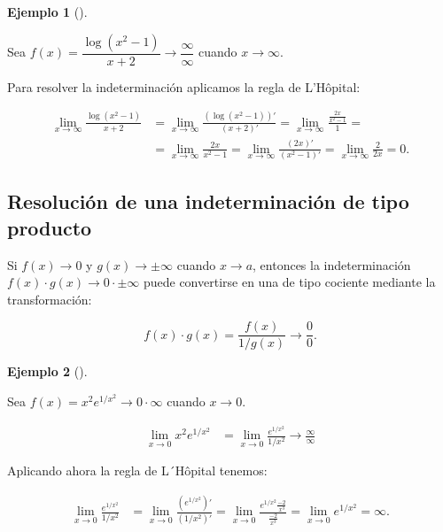 \documentclass[
  a4paper,
]{scrreport}
\theoremstyle{definition}
\newtheorem{example}{Ejemplo}[chapter]
\theoremstyle{plain}
\theoremstyle{definition}
\theoremstyle{definition}
\theoremstyle{plain}
\theoremstyle{plain}
\theoremstyle{remark}
\begin{document}
\begin{example}[]\protect\hypertarget{exm-regla-lhopital}{}\label{exm-regla-lhopital}

Sea \(f(x)=\dfrac{\log(x^2-1)}{x+2}\to \dfrac{\infty}{\infty}\) cuando
\(x\to \infty\).

Para resolver la indeterminación aplicamos la regla de L'Hôpital:

\begin{align*}
\lim_{x\to \infty}\frac{\log(x^2-1)}{x+2} &= \lim_{x\to
\infty}\frac{\left(\log(x^2-1)\right)'}{\left(x+2\right)'}= \lim_{x\to \infty}\frac{\frac{2x}{x^2-1}}{1}=\\
&=\lim_{x\to \infty}\frac{2x}{x^2-1}= \lim_{x\to \infty}\frac{\left(2x\right)'}{\left(x^2-1\right)'}=
\lim_{x\to \infty}\frac{2}{2x}=0.
\end{align*}

\end{example}

\subsection{Resolución de una indeterminación de tipo
producto}\label{resoluciuxf3n-de-una-indeterminaciuxf3n-de-tipo-producto}

Si \(f(x)\to 0\) y \(g(x)\to \pm\infty\) cuando \(x\to a\), entonces la
indeterminación \(f(x)\cdot g(x)\to 0\cdot \pm\infty\) puede convertirse
en una de tipo cociente mediante la transformación:

\[f(x)\cdot g(x) = \frac{f(x)}{1/g(x)}\to \frac{0}{0}.\]

\begin{example}[]\protect\hypertarget{exm-solucion-indeterminacion-producto}{}\label{exm-solucion-indeterminacion-producto}

Sea \(f(x)=x^2e^{1/x^2}\to 0\cdot\infty\) cuando \(x\to 0\).

\begin{align*}
\lim_{x\to 0}x^2e^{1/x^2} &= \lim_{x\to 0}\frac{e^{1/x^2}}{1/x^2}\to \frac{\infty}{\infty}
\end{align*}

Aplicando ahora la regla de L´Hôpital tenemos:

\begin{align*}
\lim_{x\to 0}\frac{e^{1/x^2}}{1/x^2} &= \lim_{x\to
0}\frac{\left(e^{1/x^2}\right)'}{\left(1/x^2\right)'} = \lim_{x\to
0}\frac{e^{1/x^2}\frac{-2}{x^3}}{\frac{-2}{x^3}} = \lim_{x\to 0}e^{1/x^2}=\infty.
\end{align*}

\end{example}
\end{document}
